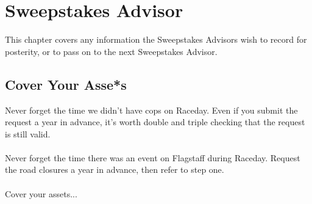 \chapter{Sweepstakes Advisor}
This chapter covers any information the Sweepstakes Advisors wish to record
for posterity, or to pass on to the next Sweepstakes Advisor.

\section{Cover Your Asse*s}
Never forget the time we didn't have cops on Raceday. Even if you submit
the request a year in advance, it's worth double and triple checking that
the request is still valid.
\\\\
Never forget the time there was an event on Flagstaff during Raceday.
Request the road closures a year in advance, then refer to step one.
\\\\
Cover your assets...
